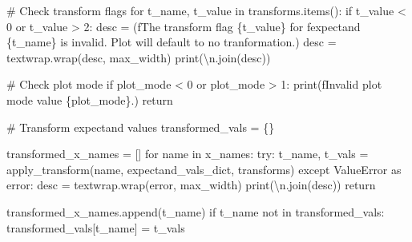 \documentclass[
  letterpaper,
  DIV=11,
  numbers=noendperiod]{scrartcl}
\newenvironment{Shaded}{\begin{snugshade}}{\end{snugshade}}
\newcommand{\BuiltInTok}[1]{\textcolor[rgb]{0.00,0.23,0.31}{#1}}
\newcommand{\CharTok}[1]{\textcolor[rgb]{0.13,0.47,0.30}{#1}}
\newcommand{\CommentTok}[1]{\textcolor[rgb]{0.37,0.37,0.37}{#1}}
\newcommand{\ControlFlowTok}[1]{\textcolor[rgb]{0.00,0.23,0.31}{#1}}
\newcommand{\DecValTok}[1]{\textcolor[rgb]{0.68,0.00,0.00}{#1}}
\newcommand{\ImportTok}[1]{\textcolor[rgb]{0.00,0.46,0.62}{#1}}
\newcommand{\KeywordTok}[1]{\textcolor[rgb]{0.00,0.23,0.31}{#1}}
\newcommand{\NormalTok}[1]{\textcolor[rgb]{0.00,0.23,0.31}{#1}}
\newcommand{\OperatorTok}[1]{\textcolor[rgb]{0.37,0.37,0.37}{#1}}
\newcommand{\PreprocessorTok}[1]{\textcolor[rgb]{0.68,0.00,0.00}{#1}}
\newcommand{\SpecialCharTok}[1]{\textcolor[rgb]{0.37,0.37,0.37}{#1}}
\newcommand{\SpecialStringTok}[1]{\textcolor[rgb]{0.13,0.47,0.30}{#1}}
\newcommand{\StringTok}[1]{\textcolor[rgb]{0.13,0.47,0.30}{#1}}
\begin{document}
\begin{Shaded}
\begin{Highlighting}[]
  \CommentTok{\# Check transform flags}
  \ControlFlowTok{for}\NormalTok{ t\_name, t\_value }\KeywordTok{in}\NormalTok{ transforms.items():}
    \ControlFlowTok{if}\NormalTok{ t\_value }\OperatorTok{\textless{}} \DecValTok{0} \KeywordTok{or}\NormalTok{ t\_value }\OperatorTok{\textgreater{}} \DecValTok{2}\NormalTok{:}
\NormalTok{      desc }\OperatorTok{=}\NormalTok{ (}\SpecialStringTok{f\textquotesingle{}The transform flag }\SpecialCharTok{\{}\NormalTok{t\_value}\SpecialCharTok{\}}\SpecialStringTok{ for \textquotesingle{}}
              \SpecialStringTok{f\textquotesingle{}expectand }\SpecialCharTok{\{}\NormalTok{t\_name}\SpecialCharTok{\}}\SpecialStringTok{ is invalid.  \textquotesingle{}}
              \StringTok{\textquotesingle{}Plot will default to no tranformation.\textquotesingle{}}\NormalTok{)}
\NormalTok{      desc }\OperatorTok{=}\NormalTok{ textwrap.wrap(desc, max\_width)}
      \BuiltInTok{print}\NormalTok{(}\StringTok{\textquotesingle{}}\CharTok{\textbackslash{}n}\StringTok{\textquotesingle{}}\NormalTok{.join(desc))}

  \CommentTok{\# Check plot mode}
  \ControlFlowTok{if}\NormalTok{ plot\_mode }\OperatorTok{\textless{}} \DecValTok{0} \KeywordTok{or}\NormalTok{ plot\_mode }\OperatorTok{\textgreater{}} \DecValTok{1}\NormalTok{:}
    \BuiltInTok{print}\NormalTok{(}\SpecialStringTok{f\textquotesingle{}Invalid \textasciigrave{}plot mode\textasciigrave{} value }\SpecialCharTok{\{}\NormalTok{plot\_mode}\SpecialCharTok{\}}\SpecialStringTok{.\textquotesingle{}}\NormalTok{)}
    \ControlFlowTok{return}

  \CommentTok{\# Transform expectand values}
\NormalTok{  transformed\_vals }\OperatorTok{=}\NormalTok{ \{\}}

\NormalTok{  transformed\_x\_names }\OperatorTok{=}\NormalTok{ []}
  \ControlFlowTok{for}\NormalTok{ name }\KeywordTok{in}\NormalTok{ x\_names:}
    \ControlFlowTok{try}\NormalTok{:}
\NormalTok{      t\_name, t\_vals }\OperatorTok{=}\NormalTok{ apply\_transform(name,}
\NormalTok{                                       expectand\_vals\_dict,}
\NormalTok{                                       transforms)}
    \ControlFlowTok{except} \PreprocessorTok{ValueError} \ImportTok{as}\NormalTok{ error:}
\NormalTok{      desc }\OperatorTok{=}\NormalTok{ textwrap.wrap(error, max\_width)}
      \BuiltInTok{print}\NormalTok{(}\StringTok{\textquotesingle{}}\CharTok{\textbackslash{}n}\StringTok{\textquotesingle{}}\NormalTok{.join(desc))}
      \ControlFlowTok{return}

\NormalTok{    transformed\_x\_names.append(t\_name)}
    \ControlFlowTok{if}\NormalTok{ t\_name }\KeywordTok{not} \KeywordTok{in}\NormalTok{ transformed\_vals:}
\NormalTok{      transformed\_vals[t\_name] }\OperatorTok{=}\NormalTok{ t\_vals}


\end{Highlighting}
\end{Shaded}
\end{document}
